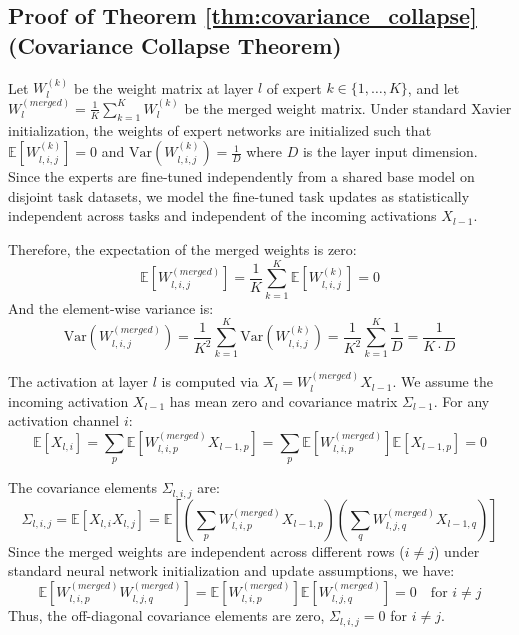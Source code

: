 \documentclass{article}
\theoremstyle{plain}
\theoremstyle{definition}
\theoremstyle{remark}
\begin{document}
\subsection{Proof of Theorem \ref{thm:covariance_collapse} (Covariance Collapse Theorem)}
Let $W_l^{(k)}$ be the weight matrix at layer $l$ of expert $k \in \{1, \dots, K\}$, and let $W_l^{(merged)} = \frac{1}{K} \sum_{k=1}^K W_l^{(k)}$ be the merged weight matrix. Under standard Xavier initialization, the weights of expert networks are initialized such that $\mathbb{E}[W_{l,i,j}^{(k)}] = 0$ and $\text{Var}(W_{l,i,j}^{(k)}) = \frac{1}{D}$ where $D$ is the layer input dimension. Since the experts are fine-tuned independently from a shared base model on disjoint task datasets, we model the fine-tuned task updates as statistically independent across tasks and independent of the incoming activations $X_{l-1}$.

Therefore, the expectation of the merged weights is zero:
$$\mathbb{E}\left[W_{l,i,j}^{(merged)}\right] = \frac{1}{K} \sum_{k=1}^K \mathbb{E}\left[W_{l,i,j}^{(k)}\right] = 0$$
And the element-wise variance is:
$$\text{Var}\left(W_{l,i,j}^{(merged)}\right) = \frac{1}{K^2} \sum_{k=1}^K \text{Var}\left(W_{l,i,j}^{(k)}\right) = \frac{1}{K^2} \sum_{k=1}^K \frac{1}{D} = \frac{1}{K \cdot D}$$

The activation at layer $l$ is computed via $X_{l} = W_l^{(merged)} X_{l-1}$. We assume the incoming activation $X_{l-1}$ has mean zero and covariance matrix $\Sigma_{l-1}$. For any activation channel $i$:
$$\mathbb{E}[X_{l,i}] = \sum_p \mathbb{E}\left[W_{l,i,p}^{(merged)} X_{l-1,p}\right] = \sum_p \mathbb{E}\left[W_{l,i,p}^{(merged)}\right] \mathbb{E}[X_{l-1,p}] = 0$$

The covariance elements $\Sigma_{l, i, j}$ are:
$$\Sigma_{l, i, j} = \mathbb{E}[X_{l,i} X_{l,j}] = \mathbb{E}\left[ \left(\sum_p W_{l,i,p}^{(merged)} X_{l-1,p}\right) \left(\sum_q W_{l,j,q}^{(merged)} X_{l-1,q}\right) \right]$$
Since the merged weights are independent across different rows ($i \neq j$) under standard neural network initialization and update assumptions, we have:
$$\mathbb{E}\left[W_{l,i,p}^{(merged)} W_{l,j,q}^{(merged)}\right] = \mathbb{E}\left[W_{l,i,p}^{(merged)}\right] \mathbb{E}\left[W_{l,j,q}^{(merged)}\right] = 0 \quad \text{for } i \neq j$$
Thus, the off-diagonal covariance elements are zero, $\Sigma_{l, i, j} = 0$ for $i \neq j$.
\end{document}
